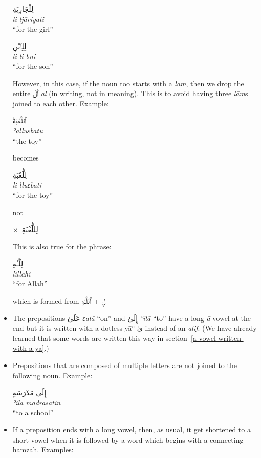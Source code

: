 \documentclass[
  10pt,
]{book}
\begin{document}
\begin{itemize}
  \foreignlanguage{arabic}{لِلْجَارِيَةِ}\\
  \emph{li-ljāriyati}\\
  \enquote{for the girl}

  \foreignlanguage{arabic}{لِلِٱبْنِ}\\
  \emph{li-li-bni}\\
  \enquote{for the son}

  However, in this case, if the noun too starts with a \emph{lām}, then we drop the entire \foreignlanguage{arabic}{ٱَلْ} \emph{al} (in writing, not in meaning). This is to avoid having three \emph{lām}s joined to each other. Example:

  \foreignlanguage{arabic}{ٱَللُّعْبَةُ}\\
  \emph{ʾalluɛbatu}\\
  \enquote{the toy}

  becomes

  \foreignlanguage{arabic}{لِلُّعْبَةِ}\\
  \emph{li-lluɛbati}\\
  \enquote{for the toy}

  not

  \(\times\)~\foreignlanguage{arabic}{لِللُّعْبَةِ}

  This is also true for the phrase:

  \foreignlanguage{arabic}{لِلَّـٰهِ}\\
  \emph{lillāhi}\\
  \enquote{for Allāh}

  which is formed from \foreignlanguage{arabic}{لِ + ٱللَّـٰهِ}
\item
  The prepositions
  \foreignlanguage{arabic}{عَلَىٰ} \emph{ɛalā} \enquote{on} and
  \foreignlanguage{arabic}{إِلَىٰ} \emph{ʾilā} \enquote{to} have a long-\emph{ā} vowel at the end but it is written with a dotless yāʾ \foreignlanguage{arabic}{ىٰ} instead of an \emph{alif}. (We have already learned that some words are written this way in section~\ref{a-vowel-written-with-a-ya}.)
\item
  Prepositions that are composed of multiple letters are not joined to the following noun. Example:

  \foreignlanguage{arabic}{إِلَىٰ مَدْرَسَةٍ}\\
  \emph{ʾilā madrasatin}\\
  \enquote{to a school}
\item
  If a preposition ends with a long vowel, then, as usual, it get shortened to a short vowel when it is followed by a word which begins with a connecting hamzah. Examples:


\end{itemize}
\end{document}
